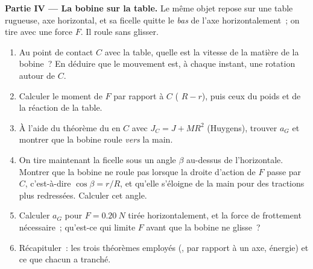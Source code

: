 \begin{problem}
\medskip
\noindent\textbf{Partie IV --- La bobine sur la table.}
Le même objet repose sur une table rugueuse, axe horizontal, et sa
ficelle quitte le \emph{bas} de l'axe horizontalement~; on tire avec une
force $F$. Il roule sans glisser.
\begin{enumerate}[resume]
  \item Au point de contact $C$ avec la table, quelle est la vitesse de
        la matière de la bobine~? En déduire que le mouvement est, à
        chaque instant, une rotation autour de $C$.
  \item Calculer le moment de $F$ par rapport à $C$ (
        $R - r$), puis ceux du poids et de la réaction de la table.
  \item À l'aide du théorème du  en $C$ avec $J_C = J +
        MR^2$ (Huygens), trouver $a_G$ et montrer que la bobine roule
        \emph{vers} la main.
  \item On tire maintenant la ficelle sous un angle $\beta$ au-dessus de
        l'horizontale. Montrer que la bobine ne roule pas lorsque la
        droite d'action de $F$ passe par $C$, c'est-à-dire
        $\cos\beta = r/R$, et qu'elle s'éloigne de la main pour des
        tractions plus redressées. Calculer cet angle.
  \item Calculer $a_G$ pour $F = \qty{0.20}{N}$ tirée horizontalement, et
        la force de frottement nécessaire~; qu'est-ce qui limite $F$
        avant que la bobine ne glisse~?
  \item Récapituler~: les trois théorèmes employés (,
         par rapport à un axe, énergie) et ce que chacun
        a tranché.
\end{enumerate}
\end{problem}
